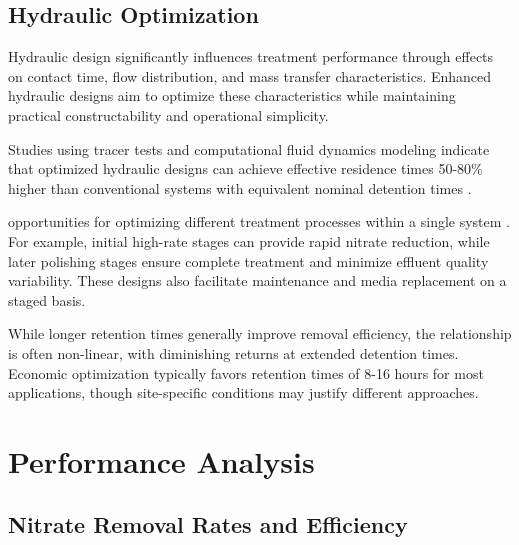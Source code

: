 \documentclass[12pt,a4paper]{article}
\begin{document}
\subsection{Hydraulic Optimization}

Hydraulic design significantly influences treatment performance through effects on contact time, flow distribution, and mass transfer characteristics.  Enhanced hydraulic designs aim to optimize these characteristics while maintaining practical constructability and operational simplicity.

 Studies using tracer tests and computational fluid dynamics modeling indicate that optimized hydraulic designs can achieve effective residence times 50-80\% higher than conventional systems with equivalent nominal detention times \citep{RN370}.

 opportunities for optimizing different treatment processes within a single system \citep{RN370}. For example, initial high-rate stages can provide rapid nitrate reduction, while later polishing stages ensure complete treatment and minimize effluent quality variability. These designs also facilitate maintenance and media replacement on a staged basis.

 While longer retention times generally improve removal efficiency, the relationship is often non-linear, with diminishing returns at extended detention times. Economic optimization typically favors retention times of 8-16 hours for most applications, though site-specific conditions may justify different approaches.

\section{Performance Analysis}

\subsection{Nitrate Removal Rates and Efficiency}
\end{document}
